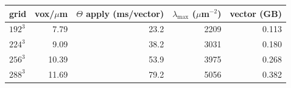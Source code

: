 \begin{tabular}{@{}lrrrr@{}}
\hline\hline
 grid & vox/$\mu$m & $\Theta$ apply (ms/vector) & $\lambda_{\max}$ ($\mu$m$^{-2}$) & vector (GB) \\
\hline
 $192^3$ & 7.79 & 23.2 & 2209 & 0.113 \\
 $224^3$ & 9.09 & 38.2 & 3031 & 0.180 \\
 $256^3$ & 10.39 & 53.9 & 3975 & 0.268 \\
 $288^3$ & 11.69 & 79.2 & 5056 & 0.382 \\
\hline\hline
\end{tabular}
